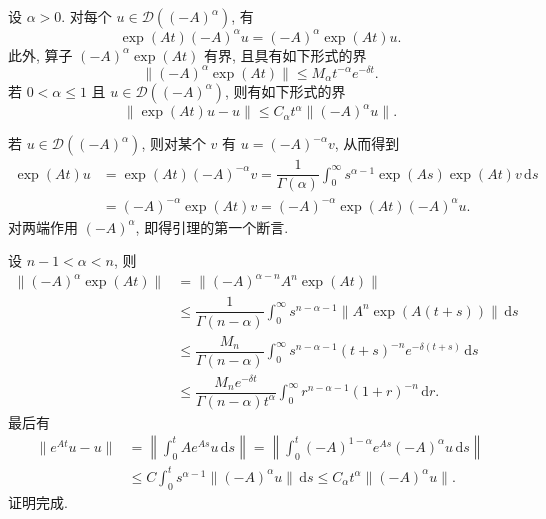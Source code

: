 \begin{Lemma}
\label{lem:fractional-power-semigroup-smoothing-holder}
设 $\alpha>0$. 对每个 $u\in\mathcal{D}((-A)^\alpha)$, 有\[\exp(At)(-A)^\alpha u=(-A)^\alpha\exp(At)u.\]此外, 算子 $(-A)^\alpha\exp(At)$ 有界, 且具有如下形式的界
\begin{equation}\label{eq:analytic-semigroup-fractional-power-smoothing-bound}
\|(-A)^\alpha\exp(At)\|\leq M_\alpha t^{-\alpha}e^{-\delta t}.
\end{equation}
若 $0<\alpha\leq1$ 且 $u\in\mathcal{D}((-A)^\alpha)$, 则有如下形式的界
\begin{equation}\label{eq:analytic-semigroup-fractional-domain-holder-orbit-bound}
\|\exp(At)u-u\|\leq C_\alpha t^\alpha\|(-A)^\alpha u\|.
\end{equation}

\end{Lemma}

\begin{Proof}
若 $u\in\mathcal{D}((-A)^\alpha)$, 则对某个 $v$ 有 $u=(-A)^{-\alpha}v$, 从而得到\[\begin{aligned}
\exp(At)u&=\exp(At)(-A)^{-\alpha}v=\dfrac{1}{\Gamma(\alpha)}\int_0^\infty s^{\alpha-1}\exp(As)\exp(At)v\,\mathrm{d}s\\
&=(-A)^{-\alpha}\exp(At)v=(-A)^{-\alpha}\exp(At)(-A)^\alpha u.
\end{aligned}\]对两端作用 $(-A)^\alpha$, 即得引理的第一个断言.\par 设 $n-1<\alpha<n$, 则\[\begin{aligned}
\|(-A)^\alpha\exp(At)\|&=\|(-A)^{\alpha-n}A^n\exp(At)\|\\
&\leq\dfrac{1}{\Gamma(n-\alpha)}\int_0^\infty s^{n-\alpha-1}\|A^n\exp(A(t+s))\|\,\mathrm{d}s\\
&\leq\dfrac{M_n}{\Gamma(n-\alpha)}\int_0^\infty s^{n-\alpha-1}(t+s)^{-n}e^{-\delta(t+s)}\,\mathrm{d}s\\
&\leq\dfrac{M_ne^{-\delta t}}{\Gamma(n-\alpha)t^\alpha}\int_0^\infty r^{n-\alpha-1}(1+r)^{-n}\,\mathrm{d}r.
\end{aligned}\]最后有\[\begin{aligned}
\|e^{At}u-u\|&=\left\|\int_0^t Ae^{As}u\,\mathrm{d}s\right\|=\left\|\int_0^t(-A)^{1-\alpha}e^{As}(-A)^\alpha u\,\mathrm{d}s\right\|\\
&\leq C\int_0^t s^{\alpha-1}\|(-A)^\alpha u\|\,\mathrm{d}s\leq C_\alpha t^\alpha\|(-A)^\alpha u\|.
\end{aligned}\]证明完成.
\end{Proof}


